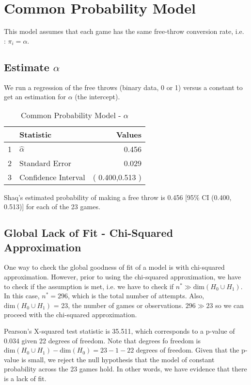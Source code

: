 \documentclass[12pt, letterpaper]{article}
\begin{document}
\section{Common Probability Model} 
This model assumes that each game has the same free-throw conversion rate, i.e. : $\pi_i = \alpha$.    

\subsection{Estimate $\alpha$} 
We run a regression of the free throws (binary data, 0 or 1) versus a constant to get an estimation for $\alpha$ (the intercept).  
\begin{table}[ht]
	\centering
	\caption{Common Probability Model -  $\alpha$} 
	\begin{tabular}{clr}
		\hline
		& Statistic & Values \\ 
		\hline
		1 & $\hat{\alpha}$ & 0.456 \\ 
		2 & Standard Error & 0.029 \\ 
		3 & Confidence Interval & ( 0.400,0.513 ) \\ 
		\hline
	\end{tabular}
\end{table}

Shaq's estimated probability of making a free throw is 0.456 [95\% CI (0.400, 0.513)] for each of the 23 games.  

\subsection{Global Lack of Fit - Chi-Squared Approximation} 
One way to check the global goodness of fit of a model is with chi-squared approximation.  However, prior to using the chi-squared approximation, we have to check if the assumption is met, i.e. we have to check if $n^* \gg \text{dim}(H_0 \cup H_1)$.  In this case, $n^* = 296$, which is the total number of attempts.  Also, $\text{dim}(H_0 \cup H_1)$ = 23, the number of games or observations.  $296 \gg 23$ so we can proceed with the chi-squared approximation.  

Pearson's X-squared test statistic is 35.511, which corresponds to a p-value of 0.034 given 22 degrees of freedom. Note that degrees fo freedom is $\text{dim}(H_0 \cup H_1)  - \text{dim}(H_0) = 23-1- 22$ degrees of freedom. Given that the p-value is small, we reject the null hypothesis that the model of constant probability across the 23 games hold.  In other words, we have evidence that there is a lack of fit.   
\end{document}
